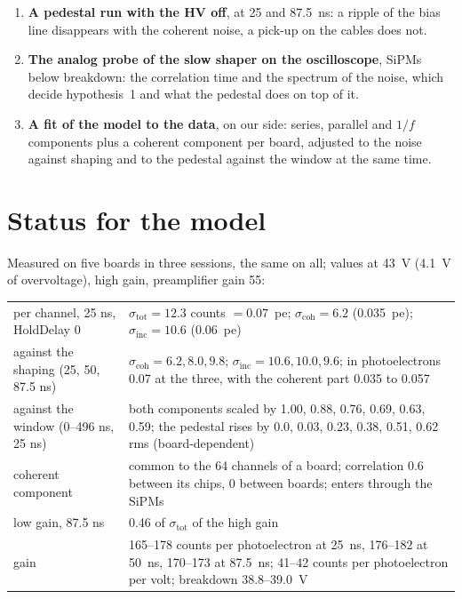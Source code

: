 \documentclass[11pt,a4paper]{article}
\begin{document}
\begin{enumerate}
\item \textbf{A pedestal run with the HV off}, at 25 and 87.5~ns: a ripple of the bias line
  disappears with the coherent noise, a pick-up on the cables does not.
\item \textbf{The analog probe of the slow shaper on the oscilloscope}, SiPMs below
  breakdown: the correlation time and the spectrum of the noise, which decide hypothesis~1 and
  what the pedestal does on top of it.
\item \textbf{A fit of the model to the data}, on our side: series, parallel and $1/f$
  components plus a coherent component per board, adjusted to the noise against shaping and
  to the pedestal against the window at the same time.
\end{enumerate}

\section{Status for the model}

Measured on five boards in three sessions, the same on all; values at 43~V (4.1~V of
overvoltage), high gain, preamplifier gain 55:

\begin{center}
\small
\begin{tabular}{lp{}}
\toprule
per channel, 25 ns, HoldDelay 0 & $\sigma_\mathrm{tot} = 12.3$ counts $= 0.07$~pe;
  $\sigma_\mathrm{coh} = 6.2$ (0.035~pe); $\sigma_\mathrm{inc} = 10.6$ (0.06~pe) \\
against the shaping (25, 50, 87.5 ns) & $\sigma_\mathrm{coh} = 6.2, 8.0, 9.8$;
  $\sigma_\mathrm{inc} = 10.6, 10.0, 9.6$; in photoelectrons 0.07 at the three, with the
  coherent part 0.035 to 0.057 \\
against the window (0--496 ns, 25 ns) & both components scaled by 1.00, 0.88, 0.76, 0.69,
  0.63, 0.59; the pedestal rises by 0.0, 0.03, 0.23, 0.38, 0.51, 0.62 rms (board-dependent) \\
coherent component & common to the 64 channels of a board; correlation 0.6 between its chips,
  0 between boards; enters through the SiPMs \\
low gain, 87.5 ns & 0.46 of $\sigma_\mathrm{tot}$ of the high gain \\
gain & 165--178 counts per photoelectron at 25~ns, 176--182 at 50~ns, 170--173 at 87.5~ns;
  41--42 counts per photoelectron per volt; breakdown 38.8--39.0~V \\
\bottomrule
\end{tabular}
\end{center}
\end{document}

